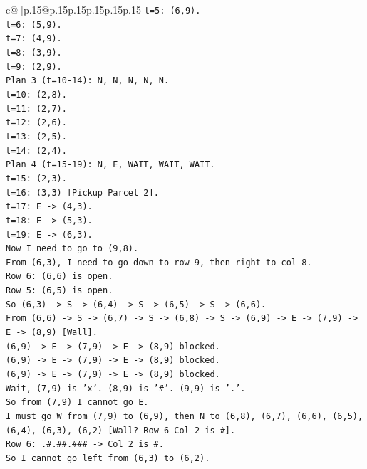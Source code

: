 \documentclass{article}
\begin{document}
{\begin{supertabular}{c@{$\;$}|p{.15\linewidth}@{}p{.15\linewidth}p{.15\linewidth}p{.15\linewidth}p{.15\linewidth}p{.15\linewidth}}
{{{\texttt{t=5: (6,9).} \\
\texttt{t=6: (5,9).} \\
\texttt{t=7: (4,9).} \\
\texttt{t=8: (3,9).} \\
\texttt{t=9: (2,9).} \\
\texttt{Plan 3 (t=10{-}14): N, N, N, N, N.} \\
\texttt{t=10: (2,8).} \\
\texttt{t=11: (2,7).} \\
\texttt{t=12: (2,6).} \\
\texttt{t=13: (2,5).} \\
\texttt{t=14: (2,4).} \\
\texttt{Plan 4 (t=15{-}19): N, E, WAIT, WAIT, WAIT.} \\
\texttt{t=15: (2,3).} \\
\texttt{t=16: (3,3) {[}Pickup Parcel 2{]}.} \\
\texttt{t=17: E {-}> (4,3).} \\
\texttt{t=18: E {-}> (5,3).} \\
\texttt{t=19: E {-}> (6,3).} \\
\texttt{Now I need to go to (9,8).} \\
\texttt{From (6,3), I need to go down to row 9, then right to col 8.} \\
\texttt{Row 6: (6,6) is open.} \\
\texttt{Row 5: (6,5) is open.} \\
\texttt{So (6,3) {-}> S {-}> (6,4) {-}> S {-}> (6,5) {-}> S {-}> (6,6).} \\
\texttt{From (6,6) {-}> S {-}> (6,7) {-}> S {-}> (6,8) {-}> S {-}> (6,9) {-}> E {-}> (7,9) {-}> E {-}> (8,9) {[}Wall{]}.} \\
\texttt{(6,9) {-}> E {-}> (7,9) {-}> E {-}> (8,9) blocked.} \\
\texttt{(6,9) {-}> E {-}> (7,9) {-}> E {-}> (8,9) blocked.} \\
\texttt{(6,9) {-}> E {-}> (7,9) {-}> E {-}> (8,9) blocked.} \\
\texttt{Wait, (7,9) is 'x'. (8,9) is '\#'. (9,9) is '.'.} \\
\texttt{So from (7,9) I cannot go E.} \\
\texttt{I must go W from (7,9) to (6,9), then N to (6,8), (6,7), (6,6), (6,5), (6,4), (6,3), (6,2) {[}Wall? Row 6 Col 2 is \#{]}.} \\
\texttt{Row 6: .\#.\#\#.\#\#\# {-}> Col 2 is \#.} \\
\texttt{So I cannot go left from (6,3) to (6,2).} \\
}}}
\end{supertabular}}
\end{document}
